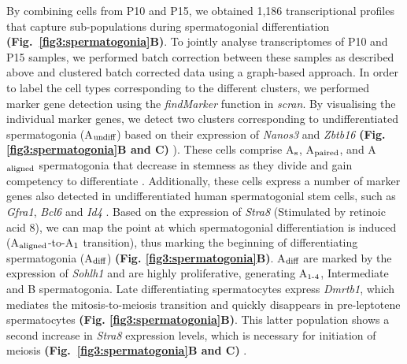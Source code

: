 By combining cells from P10 and P15, we obtained 1,186 transcriptional profiles that capture sub-populations during spermatogonial differentiation \textbf{(Fig.~\ref{fig3:spermatogonia}B)}. To jointly analyse transcriptomes of P10 and P15 samples, we performed batch correction between these samples as described above and clustered batch corrected data using a graph-based approach. In order to label the cell types corresponding to the different clusters, we performed marker gene detection using the \emph{findMarker} function in \emph{scran}. By visualising the individual marker genes, we detect two clusters corresponding to undifferentiated spermatogonia (A$_\textnormal{undiff}$) based on their expression of \textit{Nanos3} and \textit{Zbtb16} \textbf{(Fig. \ref{fig3:spermatogonia}B and C)} \citep{Buaas2004, Lolicato2008}). These cells comprise A$_\textnormal{s}$, A$_\textnormal{paired}$, and A$_\textnormal{aligned}$ spermatogonia that decrease in stemness as they divide and gain competency to differentiate \citep{Suzuki2012}. Additionally, these cells express a number of marker genes also detected in undifferentiated human spermatogonial stem cells, such as \textit{Gfra1}, \textit{Bcl6} and \textit{Id4} \citep{Guo2017}. Based on the expression of \textit{Stra8} (Stimulated by retinoic acid 8), we can map the point at which spermatogonial differentiation is induced (A$_\textnormal{aligned}$-to-A$_\textnormal{1}$ transition), thus marking the beginning of differentiating spermatogonia (A$_\textnormal{diff}$) \citep{Endo2015} \textbf{(Fig. \ref{fig3:spermatogonia}B)}. A$_\textnormal{diff}$ are marked by the expression of \textit{Sohlh1} \citep{Ballow2006} and are highly proliferative, generating A$_\textnormal{1-4}$, Intermediate and B spermatogonia. Late differentiating spermatocytes express \textit{Dmrtb1}, which mediates the mitosis-to-meiosis transition and quickly disappears in pre-leptotene spermatocytes \textbf{(Fig. \ref{fig3:spermatogonia}B)}. This latter population shows a second increase in \textit{Stra8} expression levels, which is necessary for initiation of meiosis \textbf{(Fig.~\ref{fig3:spermatogonia}B and C)} \citep{Anderson2008, Endo2015, Zhang2014}. 

\newpage

